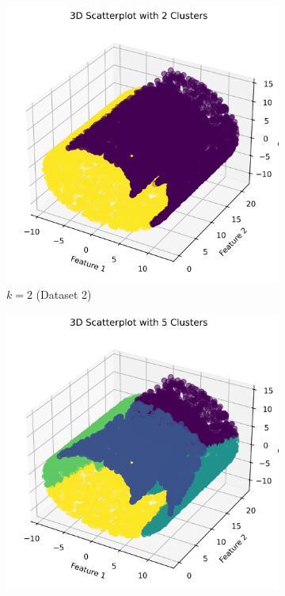 \documentclass{article}
\begin{document}
\begin{figure}[h]
    \centering
    \begin{subfigure}[b]{0.45\textwidth}
        \includegraphics[width=\textwidth]{figures/random_3d_scatter_k2_d1.png}
        \caption{$k=2$ (Dataset 2)}
        \label{fig:3d_k2}
    \end{subfigure}
    \begin{subfigure}[b]{0.45\textwidth}
        \includegraphics[width=\textwidth]{figures/random_3d_scatter_k5_d1.png}

\end{subfigure}
\end{figure}
\end{document}
